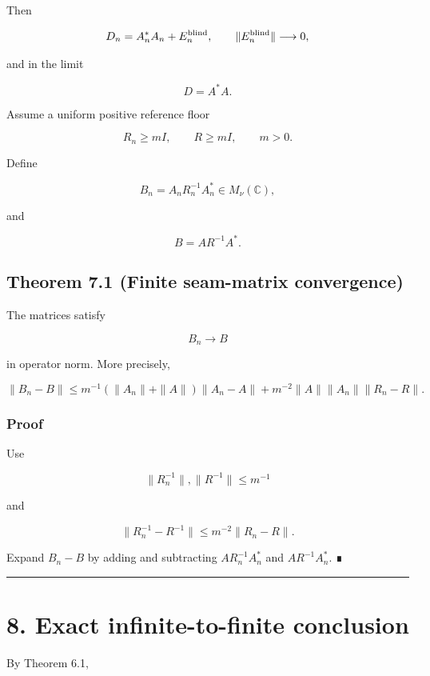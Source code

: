 Then

\[
D_n=A_n^*A_n+E_n^{\rm blind},
\qquad
\|E_n^{\rm blind}\|\longrightarrow0,
\]

and in the limit

\[
D=A^*A.
\]

Assume a uniform positive reference floor

\[
R_n\ge mI,
\qquad
R\ge mI,
\qquad m>0.
\]

Define

\[
B_n=A_nR_n^{-1}A_n^*
\in M_\nu(\mathbb C),
\]

and

\[
B=AR^{-1}A^*.
\]

\hypertarget{theorem-7.1-finite-seam-matrix-convergence}{%
\subsection{Theorem 7.1 (Finite seam-matrix convergence)}\label{theorem-7.1-finite-seam-matrix-convergence}}

The matrices satisfy

\[
B_n\longrightarrow B
\]

in operator norm. More precisely,

\[
\boxed{
\|B_n-B\|
\le
m^{-1}(\|A_n\|+\|A\|)\|A_n-A\|
+
m^{-2}\|A\|\|A_n\|\|R_n-R\|.
}
\]

\hypertarget{proof-2}{%
\subsubsection{Proof}\label{proof-2}}

Use

\[
\|R_n^{-1}\|,\|R^{-1}\|\le m^{-1}
\]

and

\[
\|R_n^{-1}-R^{-1}\|
\le
m^{-2}\|R_n-R\|.
\]

Expand \(B_n-B\) by adding and subtracting
\(AR_n^{-1}A_n^*\) and \(AR^{-1}A_n^*\). ∎

\begin{center}\rule{0.5\linewidth}{0.5pt}\end{center}

\hypertarget{exact-infinite-to-finite-conclusion}{%
\section{8. Exact infinite-to-finite conclusion}\label{exact-infinite-to-finite-conclusion}}

By Theorem 6.1,

